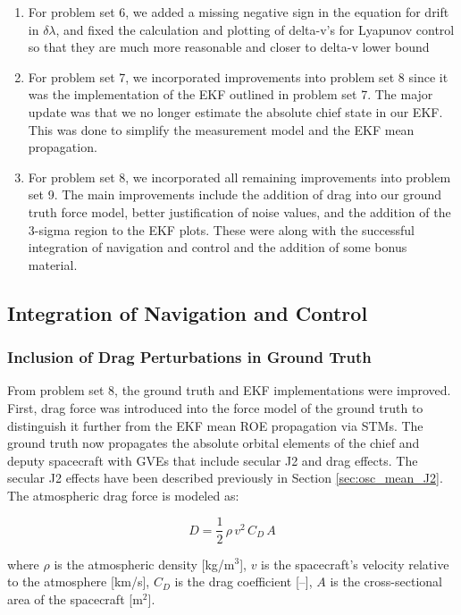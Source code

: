 \begin{enumerate}
    \item For problem set 6, we added a missing negative sign in the equation for drift in $\delta \lambda$, and fixed the calculation and plotting of delta-v's for Lyapunov control so that they are much more reasonable and closer to delta-v lower bound 
    \item For problem set 7, we incorporated improvements into problem set 8 since it was the implementation of the EKF outlined in problem set 7. The major update was that we no longer estimate the absolute chief state in our EKF. This was done to simplify the measurement model and the EKF mean propagation. 
    \item For problem set 8, we incorporated all remaining improvements into problem set 9. The main improvements include the addition of drag into our ground truth force model, better justification of noise values, and the addition of the 3-sigma region to the EKF plots. These were along with the successful integration of navigation and control and the addition of some bonus material. 
\end{enumerate}


\subsection{Integration of Navigation and Control}
\subsubsection{Inclusion of Drag Perturbations in Ground Truth}
From problem set 8, the ground truth and EKF implementations were improved. First, drag force was introduced into the force model of the ground truth to distinguish it further from the EKF mean ROE propagation via STMs. The ground truth now propagates the absolute orbital elements of the chief and deputy spacecraft with GVEs that include secular J2 and drag effects. The secular J2 effects have been described previously in Section \ref{sec:osc_mean_J2}. The atmospheric drag force is modeled as: 

\begin{equation}
    D = \frac{1}{2} \, \rho \, v^2 \, C_D \, A
\end{equation}

where $\rho$ is the atmospheric density [kg/m$^3$], $v$ is the spacecraft’s velocity relative to the atmosphere [km/s], $C_D$ is the drag coefficient [–], $A$ is the cross-sectional area of the spacecraft [m$^2$].


